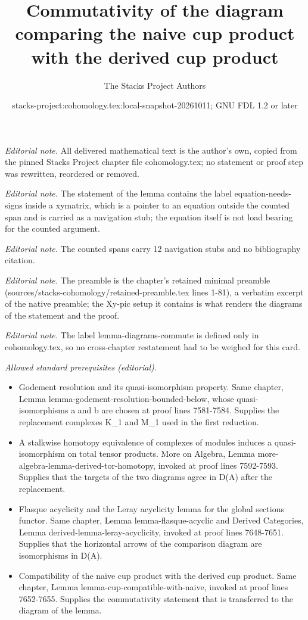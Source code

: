 \documentclass[10pt,a4paper]{amsart}
\title{Commutativity of the diagram comparing the naive cup product with the derived cup product}
\author{The Stacks Project Authors}
\date{stacks-project:cohomology.tex:local-snapshot-20261011; GNU FDL 1.2 or later}
\theoremstyle{plain}
\theoremstyle{definition}
\theoremstyle{remark}
\numberwithin{equation}{subsection}
\begin{document}
\maketitle
\noindent\textit{Editorial note.} All delivered mathematical text is the author's own, copied from the pinned Stacks Project chapter file cohomology.tex; no statement or proof step was rewritten, reordered or removed.\par\medskip
\noindent\textit{Editorial note.} The statement of the lemma contains the label equation-needs-signs inside a xymatrix, which is a pointer to an equation outside the counted span and is carried as a navigation stub; the equation itself is not load bearing for the counted argument.\par\medskip
\noindent\textit{Editorial note.} The counted spans carry 12 navigation stubs and no bibliography citation.\par\medskip
\noindent\textit{Editorial note.} The preamble is the chapter's retained minimal preamble (sources/stacks-cohomology/retained-preamble.tex lines 1-81), a verbatim excerpt of the native preamble; the Xy-pic setup it contains is what renders the diagrams of the statement and the proof.\par\medskip
\noindent\textit{Editorial note.} The label lemma-diagrams-commute is defined only in cohomology.tex, so no cross-chapter restatement had to be weighed for this card.\par\medskip
\noindent\textit{Allowed standard prerequisites (editorial).}\begin{itemize}
\item Godement resolution and its quasi-isomorphism property. Same chapter, Lemma lemma-godement-resolution-bounded-below, whose quasi-isomorphisms a and b are chosen at proof lines 7581-7584. Supplies the replacement complexes K\_1 and M\_1 used in the first reduction.
\item A stalkwise homotopy equivalence of complexes of modules induces a quasi-isomorphism on total tensor products. More on Algebra, Lemma more-algebra-lemma-derived-tor-homotopy, invoked at proof lines 7592-7593. Supplies that the targets of the two diagrams agree in D(A) after the replacement.
\item Flasque acyclicity and the Leray acyclicity lemma for the global sections functor. Same chapter, Lemma lemma-flasque-acyclic and Derived Categories, Lemma derived-lemma-leray-acyclicity, invoked at proof lines 7648-7651. Supplies that the horizontal arrows of the comparison diagram are isomorphisms in D(A).
\item Compatibility of the naive cup product with the derived cup product. Same chapter, Lemma lemma-cup-compatible-with-naive, invoked at proof lines 7652-7655. Supplies the commutativity statement that is transferred to the diagram of the lemma.
\end{itemize}\medskip
\end{document}
